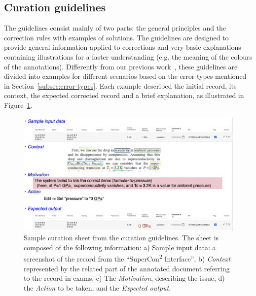 

\subsection{Curation guidelines}
\label{subsec:curation-guidelines}

The guidelines consist mainly of two parts: the general principles and the correction rules with examples of solutions.
The guidelines are designed to provide general information applied to corrections and very basic explanations containing illustrations for a faster understanding (e.g. the meaning of the colours of the annotations). 
Differently from our previous work~\cite{foppiano2021supermat}, these guidelines are divided into examples for different scenarios based on the error types mentioned in Section~\ref{subsec:error-types}.
Each example described the initial record, its context, the expected corrected record and a brief explanation, as illustrated in Figure~\ref{fig:example-curation-sheet}. 

\begin{figure}[ht]
  \centering
  \includegraphics[width=1\textwidth]{figures/curation/example-sheet-curation.png} 
  \caption{Sample curation sheet from the curation guidelines. The sheet is composed of the following information: a) {Sample input data}: a screenshot of the record from the ``SuperCon\textsuperscript{2} Interface'', b) \textit{Context} represented by the related part of the annotated document referring to the record in exams. c) The \textit{Motivation}, describing the issue, d) the \textit{Action} to be taken, and the \textit{Expected output}.
 }
  \label{fig:example-curation-sheet}
\end{figure}



